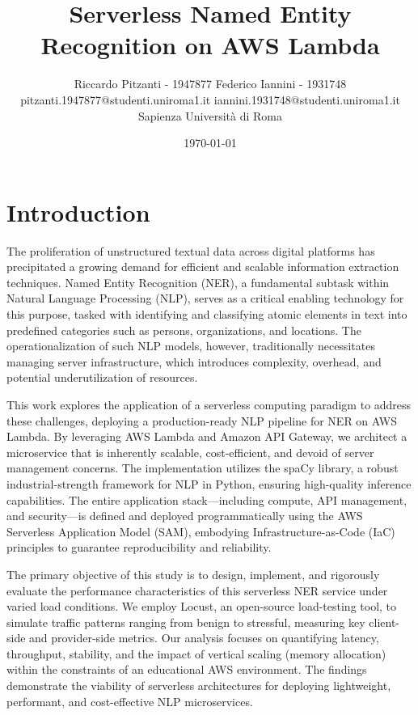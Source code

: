 \documentclass[11pt,a4paper]{article}
\title{\vspace{-1.5em}\Large\bfseries Serverless Named Entity Recognition on AWS Lambda}
\author{Riccardo Pitzanti - 1947877 \quad \quad \quad \quad Federico Iannini - 1931748\\
  \normalsize pitzanti.1947877@studenti.uniroma1.it \quad iannini.1931748@studenti.uniroma1.it\\[0.25em]
  \normalsize Sapienza Università di Roma}
\date{\normalsize \today}
\begin{document}
\maketitle
\vspace{-1.5em}

\section{Introduction}
The proliferation of unstructured textual data across digital platforms has precipitated a growing demand for efficient and scalable information extraction techniques. Named Entity Recognition (NER), a fundamental subtask within Natural Language Processing (NLP), serves as a critical enabling technology for this purpose, tasked with identifying and classifying atomic elements in text into predefined categories such as persons, organizations, and locations. The operationalization of such NLP models, however, traditionally necessitates managing server infrastructure, which introduces complexity, overhead, and potential underutilization of resources.

This work explores the application of a serverless computing paradigm to address these challenges, deploying a production-ready NLP pipeline for NER on AWS Lambda. By leveraging AWS Lambda and Amazon API Gateway, we architect a microservice that is inherently scalable, cost-efficient, and devoid of server management concerns. The implementation utilizes the spaCy library, a robust industrial-strength framework for NLP in Python, ensuring high-quality inference capabilities. The entire application stack—including compute, API management, and security—is defined and deployed programmatically using the AWS Serverless Application Model (SAM), embodying Infrastructure-as-Code (IaC) principles to guarantee reproducibility and reliability.

The primary objective of this study is to design, implement, and rigorously evaluate the performance characteristics of this serverless NER service under varied load conditions. We employ Locust, an open-source load-testing tool, to simulate traffic patterns ranging from benign to stressful, measuring key client-side and provider-side metrics. Our analysis focuses on quantifying latency, throughput, stability, and the impact of vertical scaling (memory allocation) within the constraints of an educational AWS environment. The findings demonstrate the viability of serverless architectures for deploying lightweight, performant, and cost-effective NLP microservices.
\end{document}
